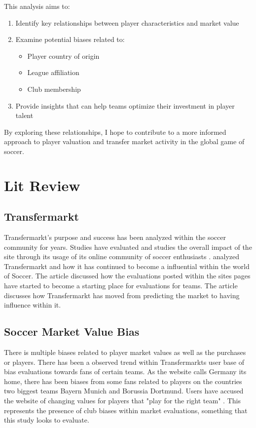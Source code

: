 \documentclass[12pt,a4paper]{article}
\begin{document}
This analysis aims to:

\begin{enumerate}
    \item Identify key relationships between player characteristics and market value
    \item Examine potential biases related to:
        \begin{itemize}
            \item Player country of origin
            \item League affiliation
            \item Club membership
        \end{itemize}
    \item Provide insights that can help teams optimize their investment in player talent
\end{enumerate}

By exploring these relationships, I hope to contribute to a more informed approach to player valuation and transfer market activity in the global game of soccer.

\section{Lit Review}
\label{sec:Lit Review}

\subsection{Transfermarkt}
\label{subsec:Transfermarkt}

Transfermarkt's purpose and success has been analyzed within the soccer community for years. Studies have evaluated and studies the overall impact of the site through its usage of its online community of soccer enthusiasts \citep{Herm2014}. \cite{Wisdom_Crowd} analyzed Transfermarkt and how it has continued to become a influential within the world of Soccer. The article discussed how the evaluations posted within the sites pages have started to become a starting place for evaluations for teams. The article discusses how Transfermarkt has moved from predicting the market to having influence within it. 

\subsection{Soccer Market Value Bias}
\label{subsec:Market Value Bias}

There is multiple biases related to player market values as well as the purchases or players. There has been a observed trend within Transfermarkts user base of bias evaluations towards fans of certain teams. As the website calls Germany its home, there has been biases from some fans related to players on the countries two biggest teams Bayern Munich and Borussia Dortmund. Users have accused the website of changing values for players that "play for the right team" \citep{Detzen2023}. This represents the presence of club biases within market evaluations, something that this study looks to evaluate. 
\end{document}
